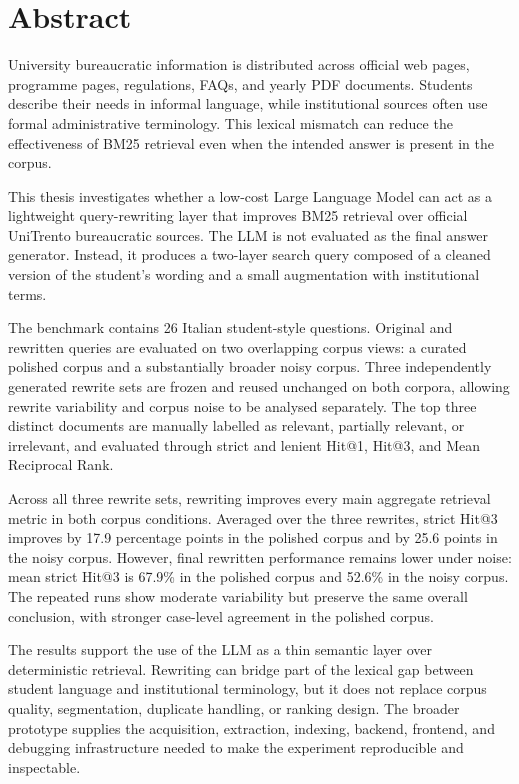 \chapter*{Abstract}
\label{sommario}

University bureaucratic information is distributed across official web pages, programme pages, regulations, FAQs, and yearly PDF documents. Students describe their needs in informal language, while institutional sources often use formal administrative terminology. This lexical mismatch can reduce the effectiveness of BM25 retrieval even when the intended answer is present in the corpus.

This thesis investigates whether a low-cost Large Language Model can act as a lightweight query-rewriting layer that improves BM25 retrieval over official UniTrento bureaucratic sources. The LLM is not evaluated as the final answer generator. Instead, it produces a two-layer search query composed of a cleaned version of the student's wording and a small augmentation with institutional terms.

The benchmark contains 26 Italian student-style questions. Original and rewritten queries are evaluated on two overlapping corpus views: a curated polished corpus and a substantially broader noisy corpus. Three independently generated rewrite sets are frozen and reused unchanged on both corpora, allowing rewrite variability and corpus noise to be analysed separately. The top three distinct documents are manually labelled as relevant, partially relevant, or irrelevant, and evaluated through strict and lenient Hit@1, Hit@3, and Mean Reciprocal Rank.

Across all three rewrite sets, rewriting improves every main aggregate retrieval metric in both corpus conditions. Averaged over the three rewrites, strict Hit@3 improves by 17.9 percentage points in the polished corpus and by 25.6 points in the noisy corpus. However, final rewritten performance remains lower under noise: mean strict Hit@3 is 67.9\% in the polished corpus and 52.6\% in the noisy corpus. The repeated runs show moderate variability but preserve the same overall conclusion, with stronger case-level agreement in the polished corpus.

The results support the use of the LLM as a thin semantic layer over deterministic retrieval. Rewriting can bridge part of the lexical gap between student language and institutional terminology, but it does not replace corpus quality, segmentation, duplicate handling, or ranking design. The broader prototype supplies the acquisition, extraction, indexing, backend, frontend, and debugging infrastructure needed to make the experiment reproducible and inspectable.
\par
